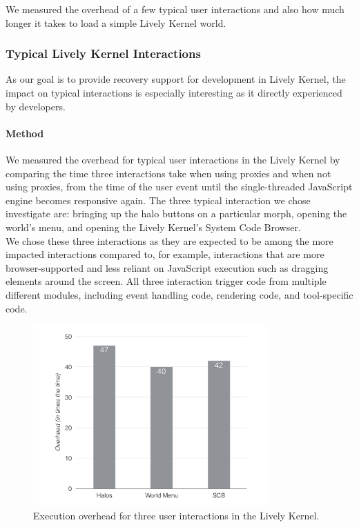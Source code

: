 We measured the overhead of a few typical user interactions and also how much longer it takes to load a simple Lively Kernel world.

\subsubsection{Typical Lively Kernel Interactions}

As our goal is to provide recovery support for development in Lively Kernel, the impact on typical interactions is especially interesting as it directly experienced by developers.

\paragraph{Method}
We measured the overhead for typical user interactions in the Lively Kernel by comparing the time three interactions take when using proxies and when not using proxies, from the time of the user event until the single-threaded JavaScript engine becomes responsive again.
The three typical interaction we chose investigate are: bringing up the halo buttons on a particular morph, opening the world's menu, and opening the Lively Kernel's System Code Browser.\\
We chose these three interactions as they are expected to be among the more impacted interactions compared to, for example, interactions that are more browser-supported and less reliant on JavaScript execution such as dragging elements around the screen.
All three interaction trigger code from multiple different modules, including event handling code, rendering code, and tool-specific code.

\begin{figure}[h]
    \centering
    \includegraphics[width=0.8\textwidth]{figures/6_evaluation/4_LivelyInteractionsOverhead.pdf}
    \caption{Execution overhead for three user interactions in the Lively Kernel.}
    \label{fig:LivelyInteractionsOverhead}
\end{figure}

